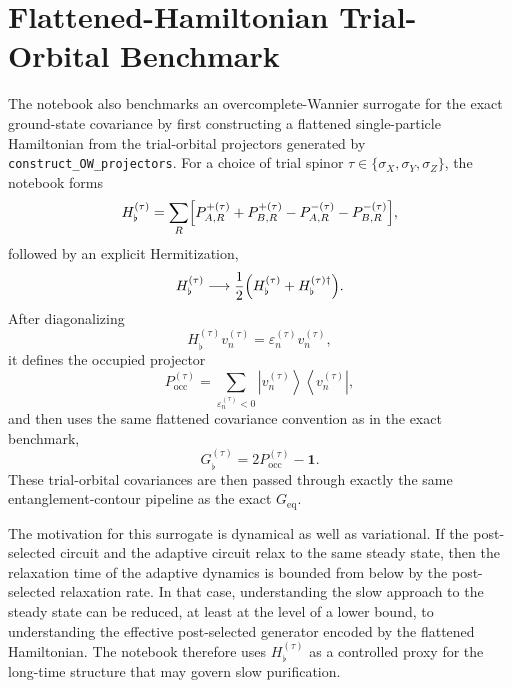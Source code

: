 \documentclass[aps,prb,onecolumn,nofootinbib]{revtex4-2}
\newcommand{\Id}{\mathbf{1}}
\begin{document}
\section{Flattened-Hamiltonian Trial-Orbital Benchmark}
The notebook also benchmarks an overcomplete-Wannier surrogate for the exact
ground-state covariance by first constructing a flattened single-particle
Hamiltonian from the trial-orbital projectors generated by
\texttt{construct\_OW\_projectors}.  For a choice of trial spinor
$\tau \in \{\sigma_X,\sigma_Y,\sigma_Z\}$, the notebook forms
\begin{equation}
H_{\flat}^{(\tau)}
=
\sum_{R}
\Bigl[
P_{A,R}^{+(\tau)} + P_{B,R}^{+(\tau)}
-
P_{A,R}^{-(\tau)} - P_{B,R}^{-(\tau)}
\Bigr],
\label{eq:hflat}
\end{equation}
followed by an explicit Hermitization,
\begin{equation}
H_{\flat}^{(\tau)} \longrightarrow
\frac{1}{2}\Bigl(H_{\flat}^{(\tau)} + H_{\flat}^{(\tau)\dagger}\Bigr).
\label{eq:hflat-herm}
\end{equation}
After diagonalizing
\begin{equation}
H_{\flat}^{(\tau)} v_n^{(\tau)} = \varepsilon_n^{(\tau)} v_n^{(\tau)},
\end{equation}
it defines the occupied projector
\begin{equation}
P_{\mathrm{occ}}^{(\tau)}
=
\sum_{\varepsilon_n^{(\tau)}<0}
\left|v_n^{(\tau)}\right\rangle \left\langle v_n^{(\tau)}\right|,
\label{eq:pocc-flat}
\end{equation}
and then uses the same flattened covariance convention as in the exact
benchmark,
\begin{equation}
G_{\flat}^{(\tau)} = 2P_{\mathrm{occ}}^{(\tau)} - \Id.
\label{eq:gflat}
\end{equation}
These trial-orbital covariances are then passed through exactly the same
entanglement-contour pipeline as the exact $G_{\mathrm{eq}}$.

The motivation for this surrogate is dynamical as well as variational.  If the
post-selected circuit and the adaptive circuit relax to the same steady state,
then the relaxation time of the adaptive dynamics is bounded from below by the
post-selected relaxation rate.  In that case, understanding the slow approach
to the steady state can be reduced, at least at the level of a lower bound, to
understanding the effective post-selected generator encoded by the flattened
Hamiltonian.  The notebook therefore uses $H_{\flat}^{(\tau)}$ as a controlled
proxy for the long-time structure that may govern slow purification.
\end{document}
